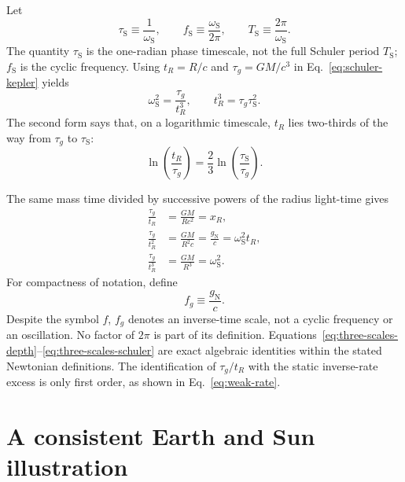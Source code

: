 \documentclass[12pt]{article}
\begin{document}
Let
\begin{equation}
  \tau_{\mathrm{S}}\equiv\frac{1}{\omega_{\mathrm{S}}},
  \qquad
  f_{\mathrm{S}}\equiv\frac{\omega_{\mathrm{S}}}{2\pi},
  \qquad
  T_{\mathrm{S}}\equiv\frac{2\pi}{\omega_{\mathrm{S}}}.
  \label{eq:schuler-times}
\end{equation}
The quantity $\tau_{\mathrm{S}}$ is the one-radian phase timescale, not the full Schuler period $T_{\mathrm{S}}$; $f_{\mathrm{S}}$ is the cyclic frequency. Using $t_R=R/c$ and $\tau_g=GM/c^3$ in Eq.~\eqref{eq:schuler-kepler} yields
\begin{equation}
  \omega_{\mathrm{S}}^2
  =\frac{\tau_g}{t_R^3},
  \qquad
  t_R^3=\tau_g\tau_{\mathrm{S}}^2.
  \label{eq:three-time-law}
\end{equation}
The second form says that, on a logarithmic timescale, $t_R$ lies two-thirds of the way from $\tau_g$ to $\tau_{\mathrm{S}}$:
\begin{equation}
  \ln\!\left(\frac{t_R}{\tau_g}\right)
  =\frac{2}{3}\ln\!\left(\frac{\tau_{\mathrm{S}}}{\tau_g}\right).
  \label{eq:log-position}
\end{equation}

The same mass time divided by successive powers of the radius light-time gives
\begin{align}
  \frac{\tau_g}{t_R}
  &=\frac{GM}{Rc^2}=x_R,
  \label{eq:three-scales-depth}\\
  \frac{\tau_g}{t_R^2}
  &=\frac{GM}{R^2c}
   =\frac{g_{\mathrm{N}}}{c}
   =\omega_{\mathrm{S}}^2t_R,
  \label{eq:three-scales-fg}\\
  \frac{\tau_g}{t_R^3}
  &=\frac{GM}{R^3}=\omega_{\mathrm{S}}^2.
  \label{eq:three-scales-schuler}
\end{align}
For compactness of notation, define
\begin{equation}
  f_g\equiv\frac{g_{\mathrm{N}}}{c}.
  \label{eq:fg-definition}
\end{equation}
Despite the symbol $f$, $f_g$ denotes an inverse-time scale, not a cyclic frequency or an oscillation. No factor of $2\pi$ is part of its definition. Equations~\eqref{eq:three-scales-depth}--\eqref{eq:three-scales-schuler} are exact algebraic identities within the stated Newtonian definitions. The identification of $\tau_g/t_R$ with the static inverse-rate excess is only first order, as shown in Eq.~\eqref{eq:weak-rate}.

\section{A consistent Earth and Sun illustration}
\end{document}
